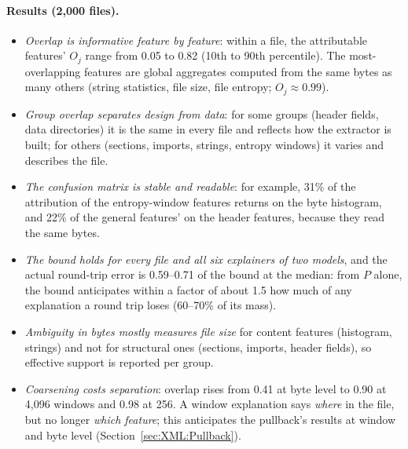 \paragraph{Results (2{,}000 files).}
\begin{itemize}[noitemsep, topsep=2pt]
    \item \textit{Overlap is informative feature by feature}: within a file, the attributable features' $O_j$ range from 0.05 to 0.82 (10th to 90th percentile). The most-overlapping features are global aggregates computed from the same bytes as many others (string statistics, file size, file entropy; $O_j \approx 0.99$).
    \item \textit{Group overlap separates design from data}: for some groups (header fields, data directories) it is the same in every file and reflects how the extractor is built; for others (sections, imports, strings, entropy windows) it varies and describes the file.
    \item \textit{The confusion matrix is stable and readable}: for example, 31\% of the attribution of the entropy-window features returns on the byte histogram, and 22\% of the general features' on the header features, because they read the same bytes.
    \item \textit{The bound holds for every file and all six explainers of two models}, and the actual round-trip error is 0.59--0.71 of the bound at the median: from $P$ alone, the bound anticipates within a factor of about 1.5 how much of any explanation a round trip loses (60--70\% of its mass).
    \item \textit{Ambiguity in bytes mostly measures file size} for content features (histogram, strings) and not for structural ones (sections, imports, header fields), so effective support is reported per group.
    \item \textit{Coarsening costs separation}: overlap rises from 0.41 at byte level to 0.90 at 4{,}096 windows and 0.98 at 256. A window explanation says \textit{where} in the file, but no longer \textit{which feature}; this anticipates the pullback's results at window and byte level (Section~\ref{sec:XML:Pullback}).
\end{itemize}

